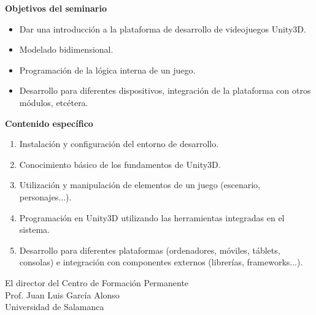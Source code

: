 \documentclass[spanish]{article}
\begin{document}
\textbf{Objetivos del seminario}
\begin{itemize}
\item Dar una introducción a la plataforma de desarrollo de videojuegos Unity3D.
\item Modelado bidimensional.
\item Programación de la lógica interna de un juego.
\item Desarrollo para diferentes dispositivos, integración de la plataforma con otros módulos, etcétera.
\end{itemize}

\vspace*{0.5cm}

\textbf{Contenido específico}
\begin{enumerate}
\item Instalación y configuración del entorno de desarrollo.
\item Conocimiento básico de los fundamentos de Unity3D.
\item Utilización y manipulación de elementos de un juego (escenario, personajes...).
\item Programación en Unity3D utilizando las herramientas integradas en el sistema.
\item Desarrollo para diferentes plataformas (ordenadores, móviles, táblets, consolas) e integración con componentes externos (librerías, frameworks...).
\end{enumerate}

\vspace*{0.7cm}

\begin{center}
El director del Centro de Formación Permanente\\
\vspace*{3cm}
Prof. Juan Luis García Alonso\\
Universidad de Salamanca
\end{center}
\end{document}
